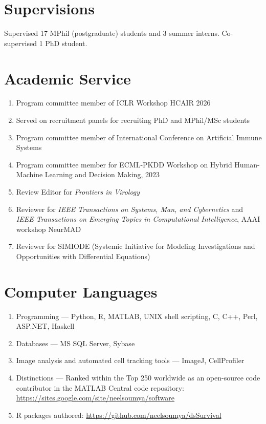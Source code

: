 \documentclass[11pt,a4paper]{article}
\begin{document}
\section*{Supervisions}
Supervised 17 MPhil (postgraduate) students and 3 summer interns. Co-supervised 1 PhD student.

\section*{Academic Service}
\begin{enumerate}
  \item Program committee member of ICLR Workshop HCAIR 2026
  \item Served on recruitment panels for recruiting PhD and MPhil/MSc students
  \item Program committee member of International Conference on Artificial Immune Systems
  \item Program committee member for ECML-PKDD Workshop on Hybrid Human-Machine Learning and Decision Making, 2023
  \item Review Editor for \textit{Frontiers in Virology}
  \item Reviewer for \textit{IEEE Transactions on Systems, Man, and Cybernetics} and \textit{IEEE Transactions on Emerging Topics in Computational Intelligence}, AAAI workshop NeurMAD
  \item Reviewer for SIMIODE (Systemic Initiative for Modeling Investigations and Opportunities with Differential Equations)
\end{enumerate}

\section*{Computer Languages}
\begin{enumerate}
  \item Programming --- Python, R, MATLAB, UNIX shell scripting, C, C++, Perl, ASP.NET, Haskell
  \item Databases --- MS SQL Server, Sybase
  \item Image analysis and automated cell tracking tools --- ImageJ, CellProfiler
  \item Distinctions --- Ranked within the Top 250 worldwide as an open-source code contributor in the MATLAB Central code repository: \url{https://sites.google.com/site/neelsoumya/software}
  \item R packages authored: \url{https://github.com/neelsoumya/dsSurvival}
\end{enumerate}
\end{document}
